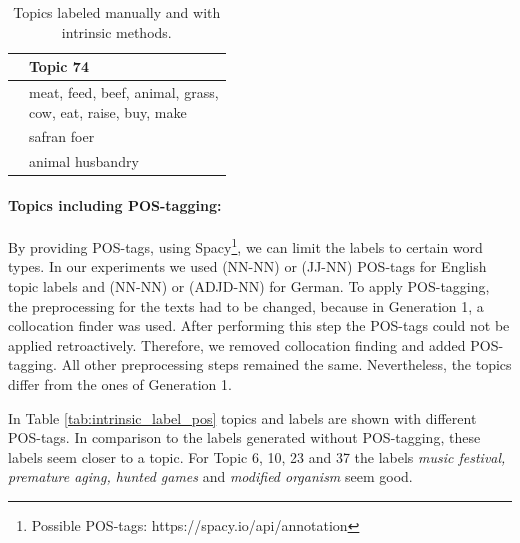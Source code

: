 {\begin{table}[h]
\begin{minipage}[t]{0.5\textwidth}
	\end{minipage}
	\begin{minipage}[t]{0.5\textwidth}
		\begin{tabular}{c|l}
			&Topic 74 \\
			\hline
			&\thead{meat, feed, beef, animal, grass,\\cow, eat, raise, buy, make} \\
			\hline
			&safran foer\\
			&animal husbandry	\\
		\end{tabular}
	\end{minipage}
	\caption[Labeled topics manually and with intrinsic method and ]{Topics labeled manually and with intrinsic methods.}
	\label{tab:extrinsic_manually}
\end{table}


\paragraph{Topics including POS-tagging:}

By providing \ac{POS}-tags, using Spacy\footnote{Possible POS-tags: https://spacy.io/api/annotation}, we can limit the labels to certain word types. In our experiments we used (NN-NN) or (JJ-NN) \ac{POS}-tags for English topic labels and (NN-NN) or (ADJD-NN) for German.  To apply \ac{POS}-tagging, the preprocessing for the texts had to be changed, because in Generation 1, a collocation finder was used. After performing this step the \ac{POS}-tags could not be applied retroactively. Therefore, we removed collocation finding and added \ac{POS}-tagging. All other preprocessing steps remained the same. Nevertheless, the topics differ from the ones of Generation 1. 

In Table \ref{tab:intrinsic_label_pos} topics and labels are shown with different \ac{POS}-tags. In comparison to the labels generated without \ac{POS}-tagging, these labels seem closer to a topic. For Topic 6, 10, 23 and 37 the labels \textit{music festival, premature aging, hunted games} and \textit{modified organism} seem good.

}
